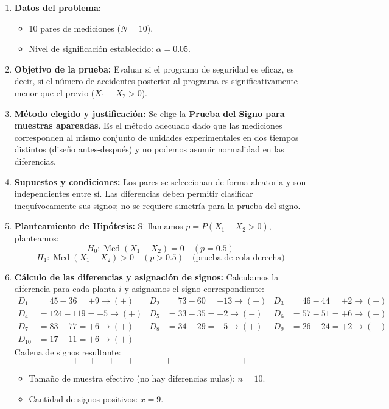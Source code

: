 \documentclass[11pt,a4paper]{article}
\begin{document}
\begin{enumerate}
    \item \textbf{Datos del problema:}
    \begin{itemize}
        \item 10 pares de mediciones ($N = 10$).
        \item Nivel de significación establecido: $\alpha = 0.05$.
    \end{itemize}

    \item \textbf{Objetivo de la prueba:}
    Evaluar si el programa de seguridad es eficaz, es decir, si el número de accidentes posterior al programa es significativamente menor que el previo ($X_1 - X_2 > 0$).

    \item \textbf{Método elegido y justificación:}
    Se elige la \textbf{Prueba del Signo para muestras apareadas}. Es el método adecuado dado que las mediciones corresponden al mismo conjunto de unidades experimentales en dos tiempos distintos (diseño antes-después) y no podemos asumir normalidad en las diferencias.

    \item \textbf{Supuestos y condiciones:}
    Los pares se seleccionan de forma aleatoria y son independientes entre sí. Las diferencias deben permitir clasificar inequívocamente sus signos; no se requiere simetría para la prueba del signo.

    \item \textbf{Planteamiento de Hipótesis:}
    Si llamamos $p = P(X_1 - X_2 > 0)$, planteamos:
    \[ H_0: \operatorname{Med}(X_1-X_2)=0 \quad (p = 0.5) \]
    \[ H_1: \operatorname{Med}(X_1-X_2)>0 \quad (p > 0.5) \quad \text{(prueba de cola derecha)} \]

    \item \textbf{Cálculo de las diferencias y asignación de signos:}
    Calculamos la diferencia para cada planta $i$ y asignamos el signo correspondiente:
    \begin{align*}
        D_1 &= 45 - 36 = +9 \rightarrow (+) & D_2 &= 73 - 60 = +13 \rightarrow (+) & D_3 &= 46 - 44 = +2 \rightarrow (+) \\
        D_4 &= 124 - 119 = +5 \rightarrow (+) & D_5 &= 33 - 35 = -2 \rightarrow (-) & D_6 &= 57 - 51 = +6 \rightarrow (+) \\
        D_7 &= 83 - 77 = +6 \rightarrow (+) & D_8 &= 34 - 29 = +5 \rightarrow (+) & D_9 &= 26 - 24 = +2 \rightarrow (+) \\
        D_{10} &= 17 - 11 = +6 \rightarrow (+)
    \end{align*}
    Cadena de signos resultante:
    \[ + \quad + \quad + \quad + \quad - \quad + \quad + \quad + \quad + \quad + \]
    \begin{itemize}
        \item Tamaño de muestra efectivo (no hay diferencias nulas): $n = 10$.
        \item Cantidad de signos positivos: $x = 9$.
    \end{itemize}


\end{enumerate}
\end{document}
